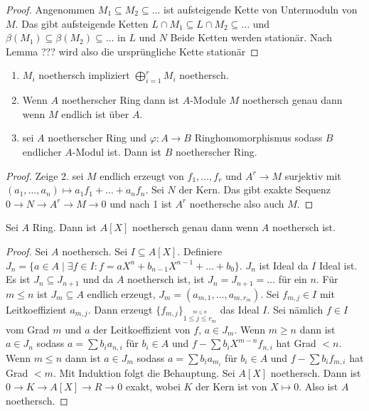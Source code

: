 \begin{proof}
    Angenommen $M_1\subseteq M_2\subseteq \dots$ ist aufsteigende Kette von Untermoduln von $M$. Das gibt aufsteigende Ketten
    $L\cap M_1\subseteq L\cap M_2\subseteq \dots$ und
    $\beta(M_1)\subseteq \beta(M_2)\subseteq \dots$ in $L$ und $N$ Beide Ketten werden stationär. Nach Lemma ??? wird also die ursprüngliche Kette stationär
\end{proof}
\begin{Kor}
    \begin{enumerate}
        \item $M_i$ noethersch impliziert $\bigoplus_{i=1}^rM_i$ noethersch.
        \item Wenn $A$ noetherscher Ring dann ist $A$-Module $M$ noethersch genau dann wenn $M$ endlich ist über $A$.
        \item sei $A$ noetherscher Ring und $\varphi\colon A\to B$ Ringhomomorphismus sodass $B$ endlicher $A$-Modul ist. Dann ist $B$ noetherscher Ring.
    \end{enumerate}
\end{Kor}
\begin{proof}
    Zeige 2. sei $M$ endlich erzeugt von $f_1,\dots,f_r$ und $A^r\to M$ surjektiv mit $(a_1,\dots,a_n)\mapsto a_1f_1+\dots+a_nf_n$. Sei $N$ der Kern. Das gibt exakte Sequenz 
    $0\to N\to A^r\to M\to 0$ und nach 1 ist $A^r$ noethersche also auch $M$.
\end{proof}
\begin{Satz} Sei $A$ Ring.  Dann ist $A[X]$ noethersch genau dann wenn $A$ noethersch ist.
\end{Satz}
\begin{proof}
    Sei $A$ noethersch.
    Sei $I\subseteq A[X]$. Definiere $J_n=\{a\in A\mid \exists f\in I\colon f=aX^n+b_{n-1}X^{n-1}+\dots+b_0\}$. $J_n$ ist Ideal da $I$ Ideal ist. Es ist $J_n\subseteq J_{n+1}$ und da $A$ noethersch ist, ist $J_n=J_{n+1}=\dots$ für ein $n$.
    Für $m\leq n$ ist $J_m\subseteq A$ endlich erzeugt, $J_m=(a_{m,1},\dots,a_{m,r_m})$. Sei $f_{m,j}\in I$ mit Leitkoeffizient $a_{m,j}$. Dann erzeugt $\{f_{m,j}\}_{\stackrel{m\leq n}{1\leq j\leq r_m}}$ das Ideal $I$. Sei nämlich $f\in I$ vom Grad $m$ und $a$ der Leitkoeffizient von $f$, $a\in J_m$.
    Wenn $m\geq n$ dann ist $a\in J_n$ sodass $a=\sum b_ia_{n,i}$ für $b_i\in A$ und $f-\sum b_iX^{m-n}f_{n,i}$ hat Grad $<n$.
    Wenn $m\leq n$ dann ist $a\in J_m$ sodass $a=\sum b_ia_{m_i}$ für $b_i\in A$ und $f-\sum b_if_{m,i}$ hat Grad $<m$. Mit Induktion folgt die Behauptung.
    Sei $A[X]$ noethersch. Dann ist $0\to K\to A[X]\to R\to 0$ exakt, wobei $K$ der Kern ist von $X\mapsto 0$. Also ist $A$ noethersch.
\end{proof}
